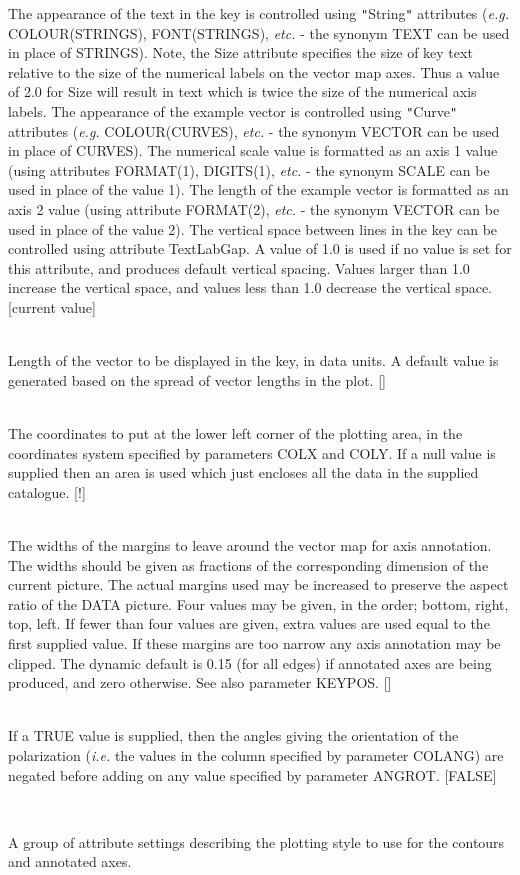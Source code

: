 \documentclass[twoside,11pt]{article}
\renewcommand{\_}{\texttt{\symbol{95}}}
\newcommand{\sstsubsection}[1]{ \item[{#1}] \mbox{} \\}
\newcommand{\sstsubsection}[1]{\item[{#1}]}
\begin{document}
{{{         The appearance of the text in the key is controlled using {\tt "}String{\tt "}
         attributes (\emph{e.g.} COLOUR(STRINGS), FONT(STRINGS), \emph{etc.} - the synonym
         TEXT can be used in place of STRINGS). Note, the Size attribute
         specifies the size of key text relative to the size of the numerical
         labels on the vector map axes. Thus a value of 2.0 for Size will
         result in text which is twice the size of the numerical axis labels.
         The appearance of the example vector is controlled using {\tt "}Curve{\tt "}
         attributes (\emph{e.g.} COLOUR(CURVES), \emph{etc.} - the synonym VECTOR can be
         used in place of CURVES). The numerical scale value is formatted as
         an axis 1 value (using attributes FORMAT(1), DIGITS(1), \emph{etc.} - the
         synonym SCALE can be used in place of the value 1). The length of
         the example vector is formatted as an axis 2 value (using attribute
         FORMAT(2), \emph{etc.} - the synonym VECTOR can be used in place of the
         value 2). The vertical space between lines in the key can be
         controlled using attribute TextLabGap. A value of 1.0 is used if
         no value is set for this attribute, and produces default vertical
         spacing. Values larger than 1.0 increase the vertical space, and
         values less than 1.0 decrease the vertical space. [current value]
      }
      \sstsubsection{
         KEYVEC = \_REAL (Read)
      }{
         Length of the vector to be displayed in the key, in data units.
         A default value is generated based on the spread of vector
         lengths in the plot. []
      }
      \sstsubsection{
         LBND(2) = \_REAL (Read)
      }{
         The coordinates to put at the lower left corner of the plotting
         area, in the coordinates system specified by parameters COLX and
         COLY. If a null value is supplied then an area is used which just
         encloses all the data in the supplied catalogue. [!]
      }
      \sstsubsection{
         MARGIN( 4 ) = \_REAL (Read)
      }{
         The widths of the margins to leave around the vector map for axis
         annotation. The widths should be given as fractions of the
         corresponding dimension of the current picture.
         The actual margins used may be increased to preserve the aspect
         ratio of the DATA picture. Four values may be given, in the order;
         bottom, right, top, left. If fewer than four values are given,
         extra values are used equal to the first supplied value. If these
         margins are too narrow any axis annotation may be clipped. The
         dynamic default is 0.15 (for all edges) if annotated axes are being
         produced, and zero otherwise. See also parameter KEYPOS. []
      }
      \sstsubsection{
         NEGATE = \_LOGICAL (Read)
      }{
         If a TRUE value is supplied, then the angles giving the
         orientation of the polarization (\emph{i.e.} the values in the column
         specified by parameter COLANG) are negated before adding on any 
         value specified by parameter ANGROT. [FALSE]
      }
      \sstsubsection{
         STYLE = GROUP (Read)
      }{
         A group of attribute settings describing the plotting style to use
         for the contours and annotated axes.

}}}
\end{document}
